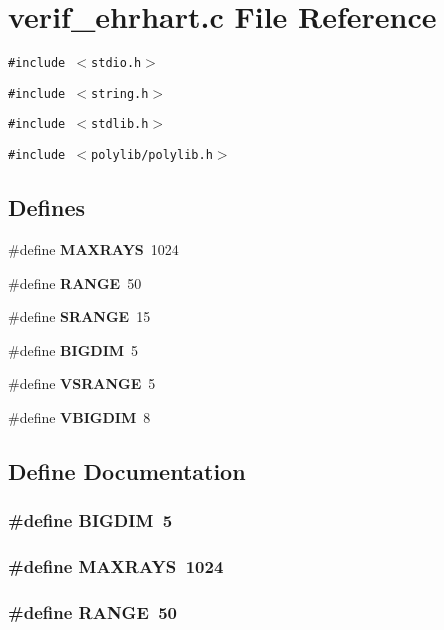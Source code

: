 \section{verif\_\-ehrhart.c File Reference}
\label{verif__ehrhart_8c}
{\tt \#include $<$stdio.h$>$}\par
{\tt \#include $<$string.h$>$}\par
{\tt \#include $<$stdlib.h$>$}\par
{\tt \#include $<$polylib/polylib.h$>$}\par
\subsection*{Defines}
\begin{CompactItemize}
\item 
\#define {\bf MAXRAYS}\ 1024
\item 
\#define {\bf RANGE}\ 50
\item 
\#define {\bf SRANGE}\ 15
\item 
\#define {\bf BIGDIM}\ 5
\item 
\#define {\bf VSRANGE}\ 5
\item 
\#define {\bf VBIGDIM}\ 8
\end{CompactItemize}


\subsection{Define Documentation}
\subsubsection{\setlength{\rightskip}{0pt plus 5cm}\#define BIGDIM\ 5}\label{verif__ehrhart_8c_a3}


\subsubsection{\setlength{\rightskip}{0pt plus 5cm}\#define MAXRAYS\ 1024}\label{verif__ehrhart_8c_a0}


\subsubsection{\setlength{\rightskip}{0pt plus 5cm}\#define RANGE\ 50}\label{verif__ehrhart_8c_a1}


